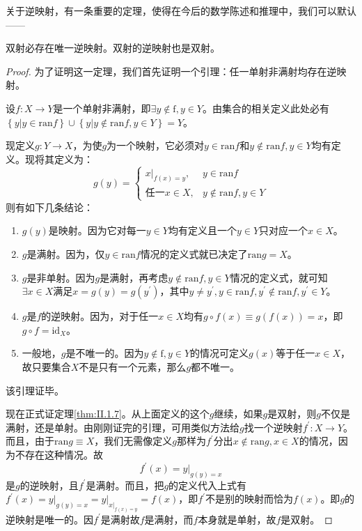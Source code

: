 \documentclass[main.tex]{subfiles}
\begin{document}
关于逆映射，有一条重要的定理，使得在今后的数学陈述和推理中，我们可以默认——
\begin{theorem}\label{thm:II.1.7}
双射必存在唯一逆映射。双射的逆映射也是双射。
\end{theorem}
\begin{proof}
为了证明这一定理，我们首先证明一个引理：任一单射非满射均存在逆映射。

设$f:X\rightarrow Y$是一个单射非满射，即$\exists y\notin\mathrm{f},y\in Y$。由集合的相关定义此处必有$\left\{y|y\in\mathrm{ran}f\right\}\cup\left\{y|y\notin\mathrm{ran}f,y\in Y\right\}=Y$。

现定义$g:Y\rightarrow X$，为使$g$为一个映射，它必须对$y\in\mathrm{ran}f$和$y\notin\mathrm{ran}f,y\in Y$均有定义。现将其定义为：
\[
g\left(y\right)=\left\{
\begin{array}{ll}
\left.x\right|_{f\left(x\right)=y},&y\in\mathrm{ran}f\\
\text{任一}x\in X,&y\notin\mathrm{ran}f,y\in Y
\end{array}
\right.
\]
则有如下几条结论：
\begin{enumerate}
    \item $g\left(y\right)$是映射。因为它对每一$y\in Y$均有定义且一个$y\in Y$只对应一个$x\in X$。
    \item $g$是满射。因为，仅$y\in\mathrm{ran}f$情况的定义式就已决定了$\mathrm{ran}g=X$。
    \item $g$是非单射。因为$g$是满射，再考虑$y\notin\mathrm{ran}f,y\in Y$情况的定义式，就可知$\exists x\in X$满足$x=g\left(y\right)=g\left(y^\prime\right)$，其中$y\neq y^\prime,y\in\mathrm{ran}f,y^\prime\notin\mathrm{ran}f,y^\prime\in Y$。
    \item $g$是$f$的逆映射。因为，对于任一$x\in X$均有$g\circ f\left(x\right)\equiv g\left(f\left(x\right)\right)=x$，即$g\circ f=\mathrm{id}_X$。
    \item 一般地，$g$是不唯一的。因为$y\notin\mathrm{f},y\in Y$的情况可定义$g\left(x\right)$等于任一$x\in X$，故只要集合$X$不是只有一个元素，那么$g$都不唯一。
\end{enumerate}
该引理证毕。

现在正式证定理\ref{thm:II.1.7}。从上面定义的这个$g$继续，如果$g$是双射，则$g$不仅是满射，还是单射。由刚刚证完的引理，可用类似方法给$g$找一个逆映射$f^\prime:X\rightarrow Y$。而且，由于$\mathrm{ran}g\equiv X$，我们无需像定义$g$那样为$f^\prime$分出$x\notin\mathrm{ran}g,x\in X$的情况，因为不存在这种情况。故
\[
f^\prime\left(x\right)=\left.y\right|_{g\left(y\right)=x}
\]
是$g$的逆映射，且$f^\prime$是满射。而且，把$g$的定义代入上式有$f^\prime\left(x\right)=\left.y\right|_{g\left(y\right)=x}=\left.y\right|_{\left.x\right|_{f\left(x\right)=y}}=f\left(x\right)$，即$f^\prime$不是别的映射而恰为$f\left(x\right)$。即$g$的逆映射是唯一的。因$f^\prime$是满射故$f$是满射，而$f$本身就是单射，故$f$是双射。
\end{proof}
\end{document}
